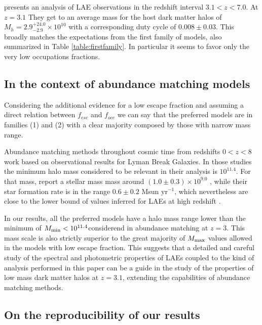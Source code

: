 \documentclass[usenatbib]{mn2e}
\newcommand{\hMsun}{{\ifmmode{h^{-1}{\rm
        {M_{\odot}}}}\else{$h^{-1}{\rm{M_{\odot}}}$}\fi}}
\begin{document}
\cite{Ouchi2010} presents an analysis of LAE observations in the
redshift interval $3.1<z<7.0$. At $z=3.1$ They get to an average
mass for the host dark matter halos of $M_{h}=2.9^{+24.0}_{-2.9}\times
10^{10}$ \hMsun with a corresponding duty cycle of $0.008\pm
0.03$. This broadly matches the expectations from the first family of
models, also summarized in Table \ref{table:firstfamily}. In
particular it seems to favor only the very low occupations fractions.  




\subsection{In the context of abundance matching models}


Considering the additional evidence for a low escape fraction and 
assuming a direct relation between $f_{esc}$ and $f_{occ}$ we can
say that the preferred models are in families (1) and (2) with a
clear majority composed by those with narrow mass range.

Abundance matching methods throughout cosmic time from redshifts
$0<z<8$ \cite{Behroozi2013a,Behroozi2013b} work based on observational
results for Lyman Break Galaxies. In those studies the minimum halo
mass considered to be relevant in their analysis is
$10^{11.4}$\hMsun. For that mass, \cite{Behroozi2013a} report a
stellar mass mass around $(1.0\pm0.3)\times 10^{9.0}$
\hMsun, while their star formation rate is in the range $0.6\pm 0.2$
Msun yr$^{-1}$, which nevertheless are close to the lower bound of
values inferred for LAEs at high redshift
\citep{Gawiser2007,Nilsson2009,Pentericci2009}.  





In our results, all the preferred models have a halo mass range lower
than the minimum of $M_{\rm min}<10^{11.4}$\hMsun considerend in
abundance matching at $z=3$. This mass scale is also strictly superior to
the great majority of  $M_{\rm max}$ values allowed in the models with
low escape fraction.   This suggests that a detailed and careful study
of the spectral and photometric properties of LAEs coupled to the kind
of analysis performed in this paper can be a guide in the study of the
properties of low mass dark matter halos at $z=3.1$, extending the
capabilities of abundance matching methods.


\subsection{On the reproducibility of our results}
\end{document}
